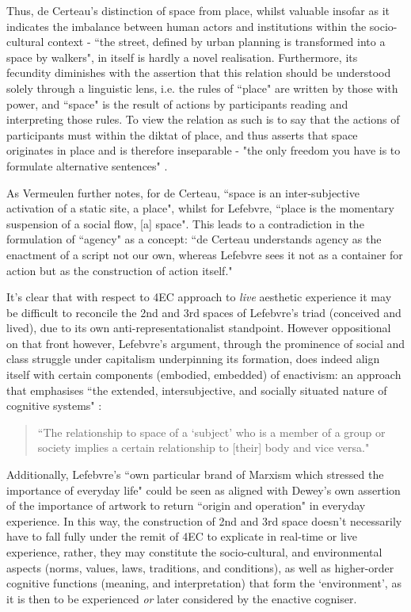 Thus, de Certeau's distinction of space from place, whilst valuable insofar as it indicates the imbalance between human actors and institutions within the socio-cultural context - ``the street, defined by urban planning is transformed into a space by walkers", in itself is hardly a novel realisation. Furthermore, its fecundity diminishes with the assertion that this relation should be understood solely through a linguistic lens, i.e. the rules of ``place" are written by those with power, and ``space" is the result of actions by participants reading and interpreting those rules. To view the relation as such is to say that the actions of participants must within the diktat of place, and thus asserts that space originates in place and is therefore inseparable - "the only freedom you have is to formulate alternative sentences" \citep{vermeulen2015}. 

As Vermeulen further notes, for de Certeau, ``space is an inter-subjective activation of a static site, a place", whilst for Lefebvre, ``place is the momentary suspension of a social flow, [a] space". This leads to a contradiction in the formulation of ``agency" as a concept: ``de Certeau understands agency as the enactment of a script not our own, whereas Lefebvre sees it not as a container for action but as the construction of action itself." 

It's clear that with respect to 4EC approach to \textit{live} aesthetic experience it may be difficult to reconcile the 2nd and 3rd spaces of Lefebvre's triad (conceived and lived), due to its own anti-representationalist standpoint. However oppositional on that front however, Lefebvre's argument, through the prominence of social and class struggle under capitalism underpinning its formation, does indeed align itself with certain components (embodied, embedded) of enactivism: an approach that emphasises ``the extended, intersubjective, and socially situated nature of cognitive systems" \citep[p. 6]{gallagher2017}: 
\begin{quote}
    ``The relationship to space of a `subject' who is a member of a group or society implies a certain relationship to [their] body and vice versa." \cite[p. 40]{lefebvre1991}
\end{quote}
Additionally, Lefebvre's ``own particular brand of Marxism which stressed the importance of everyday life" \citep[p. 8]{merrifield1993} could be seen as aligned with Dewey's own assertion of the importance of artwork to return ``origin and operation" in everyday experience. In this way, the construction of 2nd and 3rd space doesn't necessarily have to fall fully under the remit of 4EC to explicate in real-time or live experience, rather, they may constitute the socio-cultural, and environmental aspects (norms, values, laws, traditions, and  conditions), as well as higher-order cognitive functions (meaning, and interpretation) that form the `environment', as it is then to be experienced \textit{or} later considered by the enactive cogniser.

